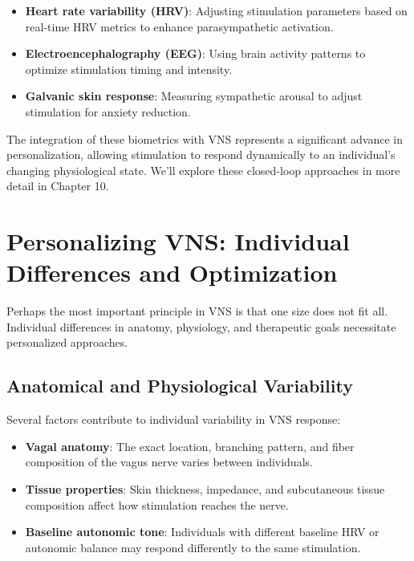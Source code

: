 \documentclass[
  Letterpaper,
]{scrbook}
\providecommand{\tightlist}{%
  \setlength{\itemsep}{0pt}\setlength{\parskip}{0pt}}\usepackage{longtable,booktabs,array}
\begin{document}
\begin{itemize}
\tightlist
\item
  \textbf{Heart rate variability (HRV)}: Adjusting stimulation
  parameters based on real-time HRV metrics to enhance parasympathetic
  activation.
\item
  \textbf{Electroencephalography (EEG)}: Using brain activity patterns
  to optimize stimulation timing and intensity.
\item
  \textbf{Galvanic skin response}: Measuring sympathetic arousal to
  adjust stimulation for anxiety reduction.
\end{itemize}

The integration of these biometrics with VNS represents a significant
advance in personalization, allowing stimulation to respond dynamically
to an individual's changing physiological state. We'll explore these
closed-loop approaches in more detail in Chapter 10.

\section{Personalizing VNS: Individual Differences and
Optimization}\label{personalizing-vns-individual-differences-and-optimization}

Perhaps the most important principle in VNS is that one size does not
fit all. Individual differences in anatomy, physiology, and therapeutic
goals necessitate personalized approaches.

\subsection{Anatomical and Physiological
Variability}\label{anatomical-and-physiological-variability}

Several factors contribute to individual variability in VNS response:

\begin{itemize}
\tightlist
\item
  \textbf{Vagal anatomy}: The exact location, branching pattern, and
  fiber composition of the vagus nerve varies between individuals.
\item
  \textbf{Tissue properties}: Skin thickness, impedance, and
  subcutaneous tissue composition affect how stimulation reaches the
  nerve.
\item
  \textbf{Baseline autonomic tone}: Individuals with different baseline
  HRV or autonomic balance may respond differently to the same
  stimulation.
\end{itemize}
\end{document}
